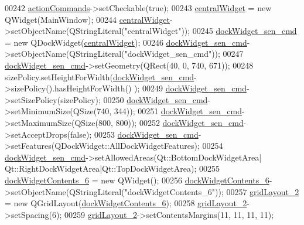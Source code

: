 \begin{DoxyCode}
00242         \hyperlink{a00027_a3dccdc21d3df68b86550093b5e3c0356}{actionCommands}->setCheckable(\textcolor{keyword}{true});
00243         \hyperlink{a00027_a30075506c2116c3ed4ff25e07ae75f81}{centralWidget} = \textcolor{keyword}{new} QWidget(MainWindow);
00244         \hyperlink{a00027_a30075506c2116c3ed4ff25e07ae75f81}{centralWidget}->setObjectName(QStringLiteral(\textcolor{stringliteral}{"centralWidget"}));
00245         \hyperlink{a00027_a9eb86a5ee396766f0f4a65f2d2bd7688}{dockWidget\_sen\_cmd} = \textcolor{keyword}{new} QDockWidget(\hyperlink{a00027_a30075506c2116c3ed4ff25e07ae75f81}{centralWidget});
00246         \hyperlink{a00027_a9eb86a5ee396766f0f4a65f2d2bd7688}{dockWidget\_sen\_cmd}->setObjectName(QStringLiteral(\textcolor{stringliteral}{"dockWidget\_sen\_cmd"}));
00247         \hyperlink{a00027_a9eb86a5ee396766f0f4a65f2d2bd7688}{dockWidget\_sen\_cmd}->setGeometry(QRect(40, 0, 740, 671));
00248         sizePolicy.setHeightForWidth(\hyperlink{a00027_a9eb86a5ee396766f0f4a65f2d2bd7688}{dockWidget\_sen\_cmd}->sizePolicy().hasHeightForWidth()
      );
00249         \hyperlink{a00027_a9eb86a5ee396766f0f4a65f2d2bd7688}{dockWidget\_sen\_cmd}->setSizePolicy(sizePolicy);
00250         \hyperlink{a00027_a9eb86a5ee396766f0f4a65f2d2bd7688}{dockWidget\_sen\_cmd}->setMinimumSize(QSize(740, 344));
00251         \hyperlink{a00027_a9eb86a5ee396766f0f4a65f2d2bd7688}{dockWidget\_sen\_cmd}->setMaximumSize(QSize(800, 800));
00252         \hyperlink{a00027_a9eb86a5ee396766f0f4a65f2d2bd7688}{dockWidget\_sen\_cmd}->setAcceptDrops(\textcolor{keyword}{false});
00253         \hyperlink{a00027_a9eb86a5ee396766f0f4a65f2d2bd7688}{dockWidget\_sen\_cmd}->setFeatures(QDockWidget::AllDockWidgetFeatures);
00254         \hyperlink{a00027_a9eb86a5ee396766f0f4a65f2d2bd7688}{dockWidget\_sen\_cmd}->setAllowedAreas(Qt::BottomDockWidgetArea|
      Qt::RightDockWidgetArea|Qt::TopDockWidgetArea);
00255         \hyperlink{a00027_a23b450a9debad2b0fecc6f063772caf2}{dockWidgetContents\_6} = \textcolor{keyword}{new} QWidget();
00256         \hyperlink{a00027_a23b450a9debad2b0fecc6f063772caf2}{dockWidgetContents\_6}->setObjectName(QStringLiteral(\textcolor{stringliteral}{"dockWidgetContents\_6"}));
00257         \hyperlink{a00027_a6b2a0c5f7e8ff2a87134908dd770d2d2}{gridLayout\_2} = \textcolor{keyword}{new} QGridLayout(\hyperlink{a00027_a23b450a9debad2b0fecc6f063772caf2}{dockWidgetContents\_6});
00258         \hyperlink{a00027_a6b2a0c5f7e8ff2a87134908dd770d2d2}{gridLayout\_2}->setSpacing(6);
00259         \hyperlink{a00027_a6b2a0c5f7e8ff2a87134908dd770d2d2}{gridLayout\_2}->setContentsMargins(11, 11, 11, 11);

\end{DoxyCode}
